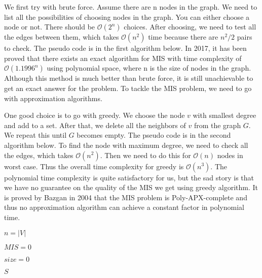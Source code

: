 \documentclass[catalog.tex]{subfiles}
\begin{document}
We first try with brute force. Assume there are n nodes in the graph. We need to list all the possibilities of choosing nodes in the graph. You can either choose a node or not. There should be $\mathcal{O}(2^n)$ choices. After choosing, we need to test all the edges between them, which takes $\mathcal{O}(n^2)$ time because there are $n^2/2$ pairs to check. The pseudo code is in the first algorithm below. In 2017, it has been proved that there exists an exact algorithm for MIS with time complexity of $\mathcal{O}(1.1996^n)$ using polynomial space, where n is the size of nodes in the graph\cite{xiao2017exact}. Although this method is much better than brute force, it is still unachievable to get an exact answer for the problem. To tackle the MIS problem, we need to go with approximation algorithms. \newline

One good choice is to go with greedy. We choose the node $v$ with smallest degree and add to a set. After that, we delete all the neighbors of $v$ from the graph $G$. We repeat this until $G$ becomes empty. The pseudo code is in the second algorithm below. To find the node with maximum degree, we need to check all the edges, which takes $\mathcal{O}(n^2)$. Then we need to do this for $\mathcal{O}(n)$ nodes in worst case. Thus the overall time complexity for greedy is $\mathcal{O}(n^3)$. The polynomial time complexity is quite satisfactory for us, but the sad story is that we have no guarantee on the quality of the MIS we get using greedy algorithm. It is proved by Bazgan in 2004 that the MIS problem is Poly-APX-complete and thus no approximation algorithm can achieve a constant factor in polynomial time\cite{bazgan2005completeness}.


\begin{Algorithm}[brute force\label{alg:\currfilebase}]
	\BlankLine
	$n = |V|$

	$MIS = 0$

	$size = 0$

	
	\Ret $S$

\end{Algorithm}
\end{document}
